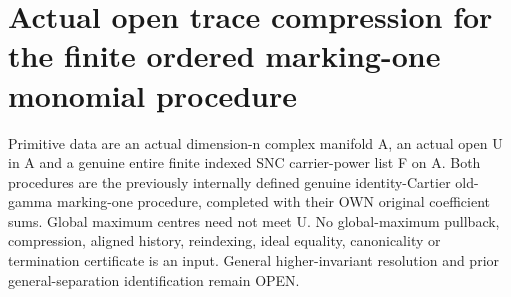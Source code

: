 \section{Actual open trace compression for the finite ordered marking-one monomial procedure}

Primitive data are an actual dimension-n complex manifold A, an actual open
U in A and a genuine entire finite indexed SNC carrier-power list F on A.
Both procedures are the previously internally defined genuine identity-Cartier
old-gamma marking-one procedure, completed with their OWN original coefficient
sums. Global maximum centres need not meet U. No global-maximum pullback,
compression, aligned history, reindexing, ideal equality, canonicality or
termination certificate is an input. General higher-invariant resolution and
prior general-separation identification remain OPEN.

